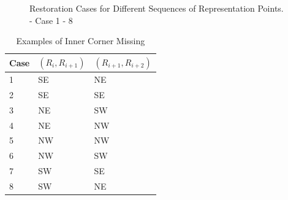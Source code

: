 \begin{figure}[htbp]
	 
	\caption{Restoration Cases for Different Sequences of Representation Points. \protect{} - \protect{} Case 1 - 8}
	\label{fig:image14}
\end{figure}

 \begin{table}[h]
	\centering
	\begin{tabularx}{0.7\textwidth}{Y|Y|Y}
		\hline
		Case & $(R_i, R_{i+1})$ & $(R_{i+1}, R_{i+2})$\\
		 & SE & NE \\
		2 & SE & SE \\
		3 & NE & SW \\
		4 & NE & NW \\
		5 & NW & NW \\
		6 & NW & SW \\
		7 & SW & SE \\
		8 & SW & NE \\
		\hline
	\end{tabularx}
	\caption{Examples of Inner Corner Missing}
	\label{table:ex_innerCornerMissing}
\end{table}


